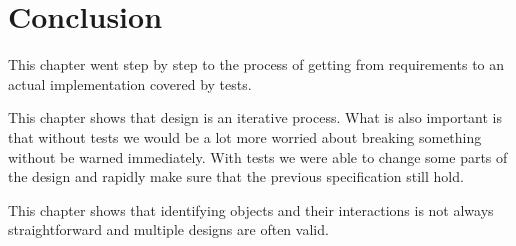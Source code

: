 \documentclass[10pt,twoside,english]{_support/latex/sbabook/sbabook}
\begin{document}
\section{Conclusion}
This chapter went step by step to the process of getting from requirements to an actual implementation covered by tests. 

This chapter shows that design is an iterative process. What is also important is that without tests we would be a lot more worried about breaking something without be warned immediately.
With tests we were able to change some parts of the design and rapidly make sure that the
previous specification still hold.

This chapter shows that identifying objects and their interactions is not always straightforward and multiple designs are often valid. 



\backmatter



\end{document}
